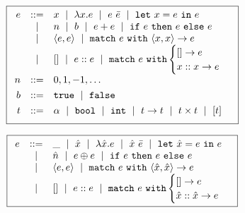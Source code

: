 \begin{figure}
\small
\centering
  \begin{minipage}[c]{\linewidth}
  \[
  \boxed{
  \begin{array}{rcl}
  e & ::=    & x \ \mid\  \lambda x. e \ \mid\  e\ \bar{e} \ \mid\  \mathtt{let}\ x = e\ \mathtt{in}\ e \\
    & \ \mid\  & n \ \mid\  b \ \mid\  e + e \ \mid\  \mathtt{if}\ e\ \mathtt{then}\ e\ \mathtt{else}\ e \\
    & \ \mid\  & \langle e, e \rangle \ \mid\  \mathtt{match}\ e\ \mathtt{with}\ \langle x, x \rangle \to e \\
    & \ \mid\  & \mathtt{[]} \ \mid\  e :: e \ \mid\  \mathtt{match}\ e\ \mathtt{with} \begin{cases} \mathtt{[]} \to e\\ x :: x \to e \end{cases} \\[0.05in]

  n & ::= &  0, 1, -1, \ldots \\[0.05in]

  b & ::= &  \mathtt{true} \ \mid\  \mathtt{false} \\[0.05in]

  t & ::= & \alpha \ \mid\  \mathtt{bool} \ \mid\  \mathtt{int} \ \mid\  t \to t \ \mid\  t \times t \ \mid\  [t] \\[0.05in]
  \end{array}
  }
  \]
  \label{fig:ml-syntax}
  \end{minipage}
  \begin{minipage}[c]{\linewidth}
    \[
    \boxed{
    \begin{array}{rcl}
    e & ::=    & \_  \ \mid\  \hat{x} \ \mid\  \lambda \hat{x}. e \ \mid\  \hat{x}\ \bar{e} \ \mid\  \mathtt{let}\ \hat{x} = e\ \mathtt{in}\ e \\
      & \ \mid\  & \hat{n} \ \mid\  e \oplus e \ \mid\  \mathtt{if}\ e\ \mathtt{then}\ e\ \mathtt{else}\ e \\
      & \ \mid\  & \langle e, e \rangle \ \mid\  \mathtt{match}\ e\ \mathtt{with}\ \langle \hat{x}, \hat{x} \rangle \to e \\
      & \ \mid\  & \mathtt{[]} \ \mid\  e :: e \ \mid\  \mathtt{match}\ e\ \mathtt{with} \begin{cases} \mathtt{[]} \to e\\ \hat{x} :: \hat{x} \to e \end{cases} \\[0.05in]
    \end{array}
    }
    \]
    \label{fig:rtl-syntax}
  \end{minipage}
\end{figure}
